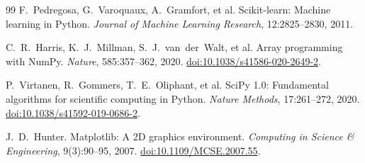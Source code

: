 \documentclass[10pt,twocolumn]{article}
\begin{document}
{\begin{thebibliography}{99}
F.~Pedregosa, G.~Varoquaux, A.~Gramfort, et al.
Scikit-learn: Machine learning in Python.
\emph{Journal of Machine Learning Research}, 12:2825--2830, 2011.

C.~R.~Harris, K.~J.~Millman, S.~J.~van~der~Walt, et al.
Array programming with NumPy.
\emph{Nature}, 585:357--362, 2020.
\href{https://doi.org/10.1038/s41586-020-2649-2}{doi:10.1038/s41586-020-2649-2}.

P.~Virtanen, R.~Gommers, T.~E.~Oliphant, et al.
SciPy 1.0: Fundamental algorithms for scientific computing in Python.
\emph{Nature Methods}, 17:261--272, 2020.
\href{https://doi.org/10.1038/s41592-019-0686-2}{doi:10.1038/s41592-019-0686-2}.

J.~D.~Hunter.
Matplotlib: A 2D graphics environment.
\emph{Computing in Science \& Engineering}, 9(3):90--95, 2007.
\href{https://doi.org/10.1109/MCSE.2007.55}{doi:10.1109/MCSE.2007.55}.

\end{thebibliography}}
\end{document}
